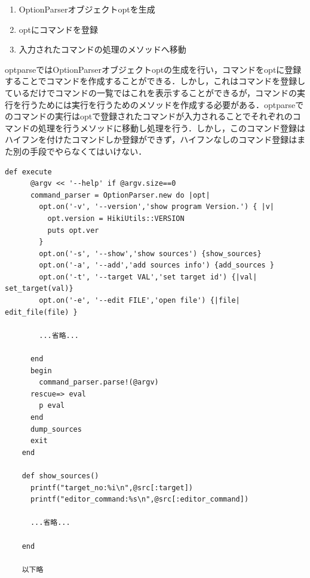 \begin{enumerate}
\item OptionParserオブジェクトoptを生成
\item optにコマンドを登録
\item 入力されたコマンドの処理のメソッドへ移動
\end{enumerate}
optparseではOptionParserオブジェクトoptの生成を行い，コマンドをoptに登録することでコマンドを作成することができる．しかし，これはコマンドを登録しているだけでコマンドの一覧ではこれを表示することができるが，コマンドの実行を行うためには実行を行うためのメソッドを作成する必要がある．optparseでのコマンドの実行はoptで登録されたコマンドが入力されることでそれぞれのコマンドの処理を行うメソッドに移動し処理を行う．しかし，このコマンド登録はハイフンを付けたコマンドしか登録ができず，ハイフンなしのコマンド登録はまた別の手段でやらなくてはいけない．
\begin{lstlisting}[style=customRuby,basicstyle={\scriptsize\ttfamily}]
    def execute
      @argv << '--help' if @argv.size==0
      command_parser = OptionParser.new do |opt|
        opt.on('-v', '--version','show program Version.') { |v|
          opt.version = HikiUtils::VERSION
          puts opt.ver
        }
        opt.on('-s', '--show','show sources') {show_sources}
        opt.on('-a', '--add','add sources info') {add_sources }
        opt.on('-t', '--target VAL','set target id') {|val| set_target(val)}
        opt.on('-e', '--edit FILE','open file') {|file| edit_file(file) }

        ...省略...

      end
      begin
        command_parser.parse!(@argv)
      rescue=> eval
        p eval
      end
      dump_sources
      exit
    end    
    
    def show_sources()
      printf("target_no:%i\n",@src[:target])
      printf("editor_command:%s\n",@src[:editor_command])

      ...省略...

    end

    以下略

\end{lstlisting}

